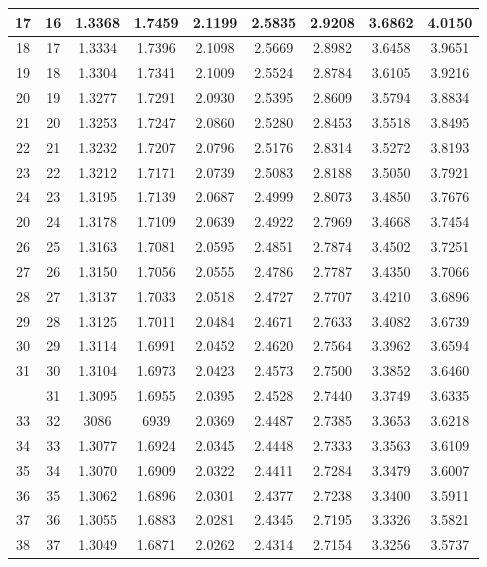 \documentclass[10pt]{article}
\begin{document}
\begin{CJK*}{UTF8}{bsmi}
\begin{center}
\begin{tabular}{|c|c|c|c|c|c|c|c|c|}
\hline
17 & 16 & 1.3368 & 1.7459 & 2.1199 & 2.5835 & 2.9208 & 3.6862 & 4.0150 \\
\hline
18 & 17 & 1.3334 & 1.7396 & 2.1098 & 2.5669 & 2.8982 & 3.6458 & 3.9651 \\
\hline
19 & 18 & 1.3304 & 1.7341 & 2.1009 & 2.5524 & 2.8784 & 3.6105 & 3.9216 \\
\hline
20 & 19 & 1.3277 & 1.7291 & 2.0930 & 2.5395 & 2.8609 & 3.5794 & 3.8834 \\
\hline
21 & 20 & 1.3253 & 1.7247 & 2.0860 & 2.5280 & 2.8453 & 3.5518 & 3.8495 \\
\hline
22 & 21 & 1.3232 & 1.7207 & 2.0796 & 2.5176 & 2.8314 & 3.5272 & 3.8193 \\
\hline
23 & 22 & 1.3212 & 1.7171 & 2.0739 & 2.5083 & 2.8188 & 3.5050 & 3.7921 \\
\hline
24 & 23 & 1.3195 & 1.7139 & 2.0687 & 2.4999 & 2.8073 & 3.4850 & 3.7676 \\
\hline
20 & 24 & 1.3178 & 1.7109 & 2.0639 & 2.4922 & 2.7969 & 3.4668 & 3.7454 \\
\hline
26 & 25 & 1.3163 & 1.7081 & 2.0595 & 2.4851 & 2.7874 & 3.4502 & 3.7251 \\
\hline
27 & 26 & 1.3150 & 1.7056 & 2.0555 & 2.4786 & 2.7787 & 3.4350 & 3.7066 \\
\hline
28 & 27 & 1.3137 & 1.7033 & 2.0518 & 2.4727 & 2.7707 & 3.4210 & 3.6896 \\
\hline
29 & 28 & 1.3125 & 1.7011 & 2.0484 & 2.4671 & 2.7633 & 3.4082 & 3.6739 \\
\hline
30 & 29 & 1.3114 & 1.6991 & 2.0452 & 2.4620 & 2.7564 & 3.3962 & 3.6594 \\
\hline
31 & 30 & 1.3104 & 1.6973 & 2.0423 & 2.4573 & 2.7500 & 3.3852 & 3.6460 \\
\hline
 & 31 & 1.3095 & 1.6955 & 2.0395 & 2.4528 & 2.7440 & 3.3749 & 3.6335 \\
\hline
33 & 32 & 3086 & 6939 & 2.0369 & 2.4487 & 2.7385 & 3.3653 & 3.6218 \\
\hline
34 & 33 & 1.3077 & 1.6924 & 2.0345 & 2.4448 & 2.7333 & 3.3563 & 3.6109 \\
\hline
35 & 34 & 1.3070 & 1.6909 & 2.0322 & 2.4411 & 2.7284 & 3.3479 & 3.6007 \\
\hline
36 & 35 & 1.3062 & 1.6896 & 2.0301 & 2.4377 & 2.7238 & 3.3400 & 3.5911 \\
\hline
37 & 36 & 1.3055 & 1.6883 & 2.0281 & 2.4345 & 2.7195 & 3.3326 & 3.5821 \\
\hline
38 & 37 & 1.3049 & 1.6871 & 2.0262 & 2.4314 & 2.7154 & 3.3256 & 3.5737 \\

\end{tabular}
\end{center}
\end{CJK*}
\end{document}

